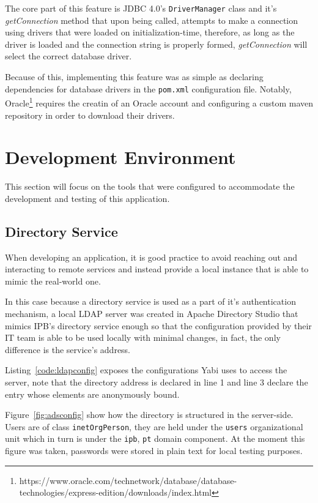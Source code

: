 The core part of this feature is \gls{JDBC} 4.0's \texttt{DriverManager} class and it's \textit{getConnection} method that upon being called, attempts to make a connection using drivers that were loaded on initialization-time, therefore, as long as the driver is loaded and the connection string is properly formed, \textit{getConnection} will select the correct database driver.

Because of this, implementing this feature was as simple as declaring dependencies for database drivers in the \texttt{pom.xml} configuration file. Notably, Oracle\footnote{https://www.oracle.com/technetwork/database/database-technologies/express-edition/downloads/index.html} requires the creatin of an Oracle account and configuring a custom maven repository in order to download their drivers.

\section{Development Environment}\label{cha:implementation:sec:development}
This section will focus on the tools that were configured to accommodate the development and testing of this application.

\subsection{Directory Service}
When developing an application, it is good practice to avoid reaching out and interacting to remote services and instead provide a local instance that is able to mimic the real-world one.

In this case because a directory service is used as a part of it's authentication mechanism, a local \gls{LDAP} server was created in Apache Directory Studio that mimics \gls{IPB}'s directory service enough so that the configuration provided by their \gls{IT} team is able to be used locally with minimal changes, in fact, the only difference is the service's address.

Listing~\ref{code:ldapconfig} exposes the configurations \gls{Yabi} uses to access the server, note that the directory address is declared in line 1 and line 3 declare the entry whose elements are anonymously bound.



Figure~\ref{fig:adsconfig} show how the directory is structured in the server-side. Users are of class \texttt{inetOrgPerson}, they are held under the \texttt{users} organizational unit which in turn is under the \texttt{ipb}, \texttt{pt} domain component. At the moment this figure was taken, passwords were stored in plain text for local testing purposes.

